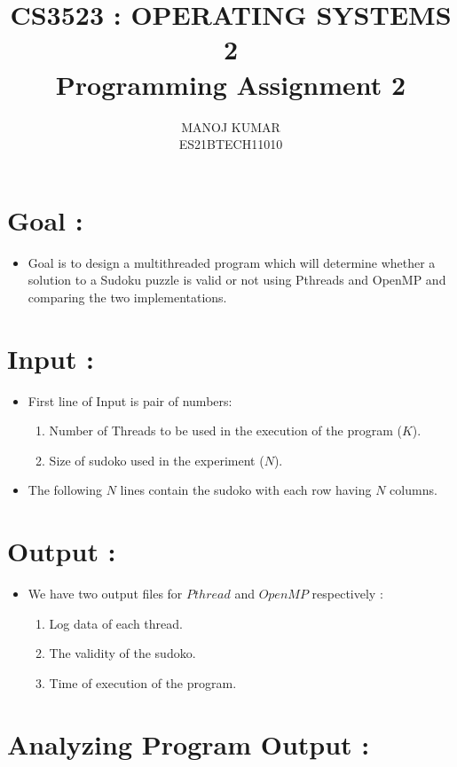 \documentclass[12pt,a4paper]{article}
\title{CS3523 : OPERATING SYSTEMS 2 \\ Programming Assignment 2}
\author{MANOJ KUMAR \\ ES21BTECH11010 }
\date{}
\begin{document}
	\maketitle
	
	\tableofcontents
	\newpage
	
	\section{Goal :}
	\begin{itemize}
		\item Goal is to design a multithreaded program which will determine whether a solution to a Sudoku puzzle is valid or not using Pthreads and OpenMP and comparing the two implementations.
	\end{itemize}
	\section{Input :}
	\begin{itemize}
		\item First line of Input is pair of numbers:
		\begin{enumerate}
			\item Number of Threads to be used in the execution of the program (\textbf{$K$}).
			\item Size of sudoko used in the experiment (\textbf{$N$}). 
		\end{enumerate}
		\item The following $N$ lines contain the sudoko with each row having $N$ columns. 
	\end{itemize}
	\section{Output :}
	\begin{itemize}
		\item We have two output files for $Pthread$ and $OpenMP$ respectively :
		\begin{enumerate}
			\item Log data of each thread.
			\item The validity of the sudoko.
			\item Time of execution of the program.
		\end{enumerate}
	\end{itemize}
	
	
	\section{ Analyzing Program Output :} 
	
\end{document}
